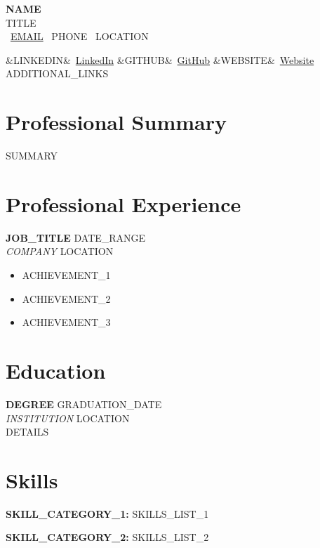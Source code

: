 \documentclass[11pt,a4paper]{article}
\newcommand{\cvheader}[5]{
    \begin{center}
        {\Huge\bfseries\color{darkgray} #1} \\[5pt]
        {\large\color{accentcolor} #2} \\[8pt]
        {\small
        \faEnvelope\ \href{mailto:#3}{#3} \quad
        \faPhone\ #4 \quad
        \faMapMarker\ #5}
    \end{center}
    \vspace{5pt}
}
\newcommand{\cvlinks}[4]{
    \begin{center}
        {\small
        \ifx&#1&\else\faLinkedin\ \href{#1}{LinkedIn} \quad\fi
        \ifx&#2&\else\faGithub\ \href{#2}{GitHub} \quad\fi
        \ifx&#3&\else\faGlobe\ \href{#3}{Website} \quad\fi
        #4}
    \end{center}
    \vspace{5pt}
}
\newcommand{\cventry}[5]{
    \textbf{#1} \hfill {\small\color{darkgray} #2} \\
    {\color{accentcolor}\textit{#3}} \hfill {\small\color{darkgray} #4} \\
    #5
    \vspace{8pt}
}
\newcommand{\cveducation}[5]{
    \textbf{#1} \hfill {\small\color{darkgray} #2} \\
    {\textit{#3}} \hfill {\small\color{darkgray} #4} \\
    #5
    \vspace{8pt}
}
\begin{document}
\cvheader
    {{NAME}}
    {{TITLE}}
    {{EMAIL}}
    {{PHONE}}
    {{LOCATION}}

\cvlinks
    {{LINKEDIN}}
    {{GITHUB}}
    {{WEBSITE}}
    {{ADDITIONAL_LINKS}}

\section*{Professional Summary}
{{SUMMARY}}

\section*{Professional Experience}

\cventry
    {{JOB_TITLE}}
    {{DATE_RANGE}}
    {{COMPANY}}
    {{LOCATION}}
    {
    \begin{itemize}[leftmargin=*, itemsep=1pt, parsep=0pt]
        \item {{ACHIEVEMENT_1}}
        \item {{ACHIEVEMENT_2}}
        \item {{ACHIEVEMENT_3}}
    \end{itemize}
    }


\section*{Education}

\cveducation
    {{DEGREE}}
    {{GRADUATION_DATE}}
    {{INSTITUTION}}
    {{LOCATION}}
    {{{DETAILS}}}

\section*{Skills}

\textbf{{{SKILL_CATEGORY_1}}:} {{SKILLS_LIST_1}}

\textbf{{{SKILL_CATEGORY_2}}:} {{SKILLS_LIST_2}}

\end{document}
